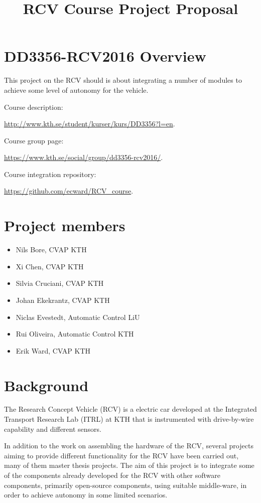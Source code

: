\documentclass[11pt,a4paper]{article}
\title{RCV Course Project Proposal}
\begin{document}
\maketitle

\section{DD3356-RCV2016 Overview}

This project on the RCV should is about integrating a number of modules to achieve some level of autonomy for the vehicle.

Course description:

\url{http://www.kth.se/student/kurser/kurs/DD3356?l=en}.

Course group page:

\url{https://www.kth.se/social/group/dd3356-rcv2016/}.

Course integration repository:

\url{https://github.com/ecward/RCV_course}.

\section{Project members}

\begin{itemize}
\item Nils Bore, CVAP KTH
\item Xi Chen, CVAP KTH
\item Silvia Cruciani, CVAP KTH
\item Johan Ekekrantz, CVAP KTH
\item Niclas Evestedt, Automatic Control LiU
\item Rui Oliveira, Automatic Control KTH
\item Erik Ward, CVAP KTH
\end{itemize}

\section{Background}

The Research Concept Vehicle (RCV) is a electric car developed at the
Integrated Transport Research Lab (ITRL) at KTH that is instrumented
with drive-by-wire capability and different sensors.

In addition to the work on assembling the hardware of the RCV, several
projects aiming to provide different functionality for the RCV have
been carried out, many of them master thesis projects. The aim of this
project is to integrate some of the components already developed for
the RCV with other software components, primarily open-source
components, using suitable middle-ware, in order to achieve
autonomy in some limited scenarios.
\end{document}
